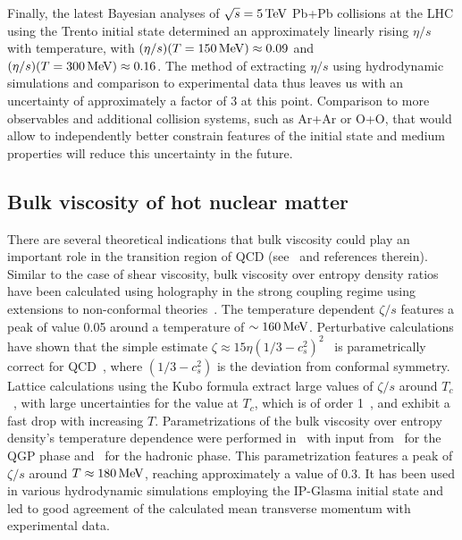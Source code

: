 Finally, the latest Bayesian analyses of $\sqrt{s}=5\,{\rm TeV}$ Pb+Pb 
  collisions at the LHC using the Trento initial state determined an 
  approximately linearly rising $\eta/s$ with temperature, with 
  $(\eta/s)(T=150\,{\rm MeV})\approx 0.09$ and 
  $(\eta/s)(T=300\,{\rm MeV})\approx 0.16$.
The method of extracting $\eta/s$ using hydrodynamic simulations and comparison 
  to experimental data thus leaves us with an uncertainty of approximately 
  a factor of $3$ at this point. 
Comparison to more observables and additional collision systems, such as Ar+Ar or O+O, 
  that would allow to independently better 
  constrain features of the initial state and medium properties will 
  reduce this uncertainty in the future. 


\subsection{Bulk viscosity of hot nuclear matter}
There are several theoretical indications that bulk viscosity could play 
  an important role in the transition region of QCD (see~\cite{Ryu:2017qzn} 
  and references therein). 
Similar to the case of shear viscosity, bulk viscosity over entropy density 
  ratios have been calculated using holography in the strong coupling regime 
  using extensions to non-conformal theories~\cite{Buchel:2007mf,Finazzo:2014cna}. 
The temperature dependent $\zeta/s$ features a peak of value 0.05 around a 
  temperature of $\sim 160\,{\rm MeV}$. 
Perturbative calculations have shown that the simple estimate 
  $\zeta\approx 15 \eta(1/3-c_s^2)^2$~\cite{Horsley:1985dz} is parametrically 
  correct for QCD~\cite{Arnold:2006fz}, where $(1/3-c_s^2)$ is the deviation 
  from conformal symmetry. 
Lattice calculations using the Kubo formula extract large values of $\zeta/s$ 
  around $T_c$~\cite{Karsch:2007jc,Meyer:2007dy}, with large uncertainties for 
  the value at $T_c$, which is of order 1~\cite{Kharzeev:2007wb}, and exhibit 
  a fast drop with increasing $T$.
Parametrizations of the bulk viscosity over entropy density's temperature 
  dependence were performed in~\cite{Denicol:2009am} with input from~\cite{Karsch:2007jc} 
  for the QGP phase and~\cite{NoronhaHostler:2008ju} for the hadronic phase. 
This parametrization features a peak of $\zeta/s$ around $T\approx 180\,{\rm MeV}$, 
  reaching approximately a value of 0.3. 
It has been used in various hydrodynamic simulations employing the IP-Glasma 
  initial state and led to good agreement of the calculated mean transverse 
  momentum with experimental data. 
